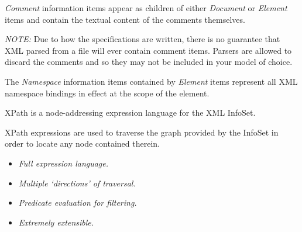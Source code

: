 \documentclass[20pt,landscape,headrule,footrule]{foils}
\begin{document}


\emph{Comment} information items appear as children of either
\emph{Document} or \emph{Element} items and contain the textual
content of the comments themselves.

\begin{codelisting}
\end{codelisting}

\emph{NOTE:} Due to how the specifications are written, there is no
guarantee that XML parsed from a file will ever contain comment
items.  Parsers are allowed to discard the comments and so they
may not be included in your model of choice.



The \emph{Namespace} information items contained by \emph{Element}
items represent all XML namespace bindings in effect at the scope of
the element.

\begin{codelisting}
\end{codelisting}



XPath is a node-addressing expression language for the XML InfoSet.

XPath expressions are used to traverse the graph provided by the
InfoSet in order to locate any node contained therein.  

\begin{itemize}
  \item \emph{Full expression language.}
  \item \emph{Multiple `directions' of traversal.}
  \item \emph{Predicate evaluation for filtering.}
  \item \emph{Extremely extensible.}
\end{itemize}
\end{document}

